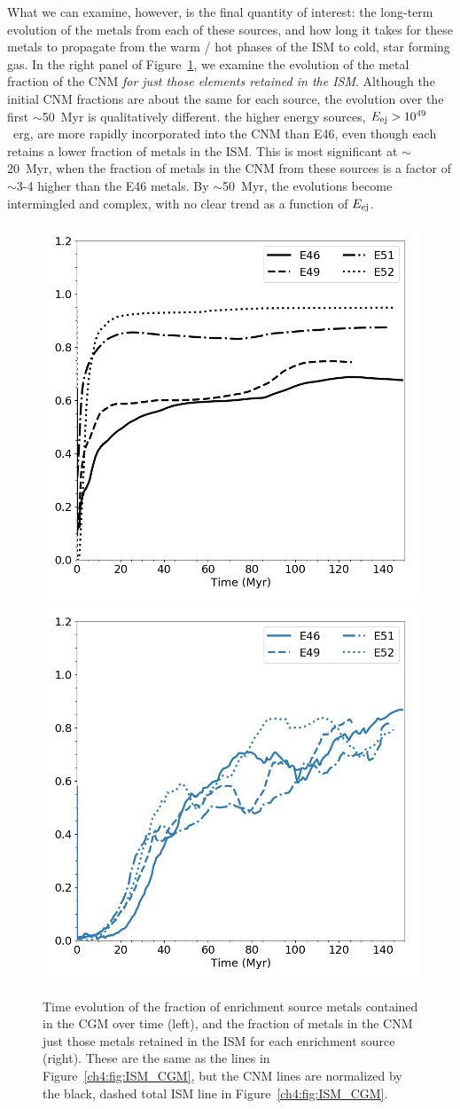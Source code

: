 What we can examine, however, is the final quantity of interest: the long-term evolution of the metals from each of these sources, and how long it takes for these metals to propagate from the warm / hot phases of the ISM to cold, star forming gas. In the right panel of Figure~\ref{ch4:fig:CGM_CNM}, we examine the evolution of the metal fraction of the CNM \textit{for just those elements retained in the ISM}. Although the initial CNM fractions are about the same for each source, the evolution over the first $\sim$50~Myr is qualitatively different. the higher energy sources, $E_{\rm ej} > 10^{49}$~erg, are more rapidly incorporated into the CNM than E46, even though each retains a lower fraction of metals in the ISM. This is most significant at $\sim$20~Myr, when the fraction of metals in the CNM from these sources is a factor of $\sim$3-4 higher than the E46 metals. By $\sim$50~Myr, the evolutions become intermingled and complex, with no clear trend as a function of $E_{\rm ej}$.

\begin{figure}
  \centering
  \includegraphics[width=0.45\linewidth]{figures/ch4/CGM_average_evolution}
  \includegraphics[width=0.45\linewidth]{figures/ch4/CNM_average_evolution}
  \caption{Time evolution of the fraction of enrichment source metals contained in the CGM over time (left), and the fraction of metals in the CNM just those metals retained in the ISM for each enrichment source (right). These are the same as the lines in Figure~\ref{ch4:fig:ISM_CGM}, but the CNM lines are normalized by the black, dashed total ISM line in Figure~\ref{ch4:fig:ISM_CGM}.}
  \label{ch4:fig:CGM_CNM}
\end{figure}


